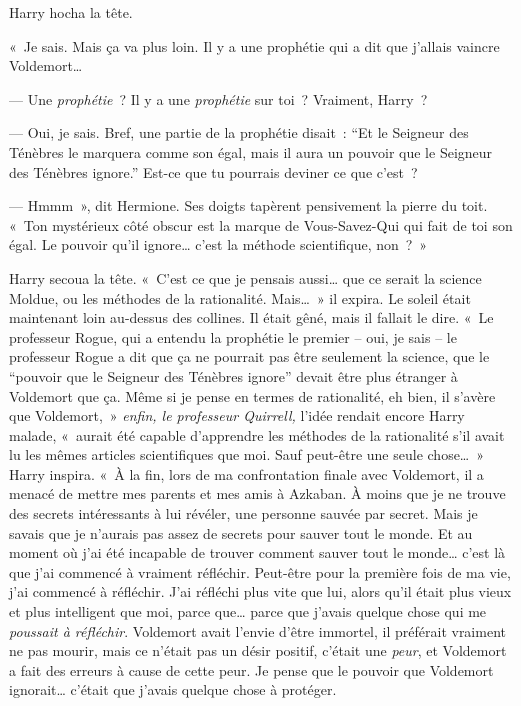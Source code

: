 Harry hocha la tête.

«~Je sais.
Mais ça va plus loin.
Il y a une prophétie qui a dit que j'allais vaincre Voldemort…

--- Une \emph{prophétie}~?
Il y a une \emph{prophétie} sur toi~?
Vraiment, Harry~?

--- Oui, je sais.
Bref, une partie de la prophétie disait~: “Et le Seigneur des Ténèbres le marquera comme son égal, mais il aura un pouvoir que le Seigneur des Ténèbres ignore.” Est-ce que tu pourrais deviner ce que c'est~?

--- Hmmm~», dit Hermione.
Ses doigts tapèrent pensivement la pierre du toit.
«~Ton mystérieux côté obscur est la marque de Vous-Savez-Qui qui fait de toi son égal.
Le pouvoir qu'il ignore… c'est la méthode scientifique, non~?~»

Harry secoua la tête.
«~C'est ce que je pensais aussi… que ce serait la science Moldue, ou les méthodes de la rationalité.
Mais…~» il expira.
Le soleil était maintenant loin au-dessus des collines.
Il était gêné, mais il fallait le dire.
«~Le professeur Rogue, qui a entendu la prophétie le premier -- oui, je sais -- le professeur Rogue a dit que ça ne pourrait pas être seulement la science, que le “pouvoir que le Seigneur des Ténèbres ignore” devait être plus étranger à Voldemort que ça.
Même si je pense en termes de rationalité, eh bien, il s'avère que Voldemort,~» \emph{enfin, le professeur Quirrell,} l'idée rendait encore Harry malade, «~aurait été capable d'apprendre les méthodes de la rationalité s'il avait lu les mêmes articles scientifiques que moi.
Sauf peut-être une seule chose…~»
Harry inspira.
«~À la fin, lors de ma confrontation finale avec Voldemort, il a menacé de mettre mes parents et mes amis à Azkaban.
À moins que je ne trouve des secrets intéressants à lui révéler, une personne sauvée par secret.
Mais je savais que je n'aurais pas assez de secrets pour sauver tout le monde.
Et au moment où j'ai été incapable de trouver comment sauver tout le monde… c'est là que j'ai commencé à vraiment réfléchir.
Peut-être pour la première fois de ma vie, j'ai commencé à réfléchir.
J'ai réfléchi plus vite que lui, alors qu'il était plus vieux et plus intelligent que moi, parce que… parce que j'avais quelque chose qui me \emph{poussait à réfléchir}.
Voldemort avait l'envie d'être immortel, il préférait vraiment ne pas mourir, mais ce n'était pas un désir positif, c'était une \emph{peur}, et Voldemort a fait des erreurs à cause de cette peur.
Je pense que le pouvoir que Voldemort ignorait… c'était que j'avais quelque chose à protéger.

